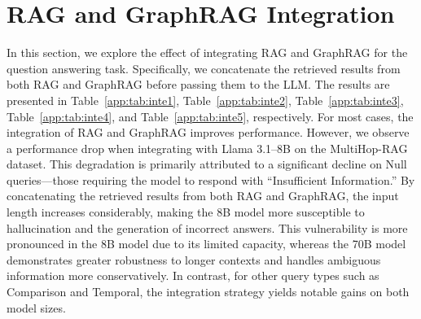 \section{RAG and GraphRAG Integration}
\label{app:inte}
In this section, we explore the effect of integrating RAG and GraphRAG for the question answering task. Specifically, we concatenate the retrieved results from both RAG and GraphRAG before passing them to the LLM. The results are presented in Table~\ref{app:tab:inte1}, Table~\ref{app:tab:inte2}, Table~\ref{app:tab:inte3}, Table~\ref{app:tab:inte4}, and Table~\ref{app:tab:inte5}, respectively. For most cases, the integration of RAG and GraphRAG improves performance. However, we observe a performance drop when integrating with Llama 3.1–8B on the MultiHop-RAG dataset. This degradation is primarily attributed to a significant decline on Null queries—those requiring the model to respond with “Insufficient Information.” By concatenating the retrieved results from both RAG and GraphRAG, the input length increases considerably, making the 8B model more susceptible to hallucination and the generation of incorrect answers. This vulnerability is more pronounced in the 8B model due to its limited capacity, whereas the 70B model demonstrates greater robustness to longer contexts and handles ambiguous information more conservatively. In contrast, for other query types such as Comparison and Temporal, the integration strategy yields notable gains on both model sizes.

\begin{table}[!htb]
\centering
\caption{Performance comparison of RAG, GraphRAG, and their integration on NQ and Hotpot datasets}
\label{app:tab:inte1}
\end{table}

